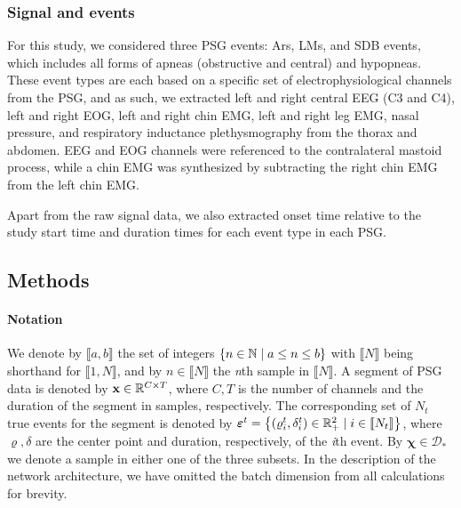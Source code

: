 \subsubsection{Signal and events}
For this study, we considered three \ac{PSG} events: \acp{Ar}, \acp{LM}, and \ac{SDB} events, which includes all forms of apneas (obstructive and central) and hypopneas.
These event types are each based on a specific set of electrophysiological channels from the \ac{PSG}, and as such, we extracted left and right central \ac{EEG} (C3 and C4), left and right \ac{EOG}, left and right chin \ac{EMG}, left and right leg \ac{EMG}, nasal pressure, and respiratory inductance plethysmography from the thorax and abdomen.
\Ac{EEG} and \ac{EOG} channels were referenced to the contralateral mastoid process, while a chin \ac{EMG} was synthesized by subtracting the right chin \ac{EMG} from the left chin \ac{EMG}.

Apart from the raw signal data, we also extracted onset time relative to the study start time and duration times for each event type in each \ac{PSG}.



\subsection{Methods}

\paragraph{Notation}
We denote by \(\llbracket a, b \rrbracket\) the set of integers \(\lbrace n \in \mathbb{N} \mid a \leq n \leq b\rbrace\) with \(\llbracket N \rrbracket\) being shorthand for \(\llbracket 1, N \rrbracket\), and by \(n \in \llbracket N \rrbracket \) the \textit{n}th sample in \(\llbracket N \rrbracket\).
A segment of PSG data is denoted by \(\mathbf{x} \in \mathbb{R}^{C \times T}\), where \(C, T\) is the number of channels and the duration of the segment in samples, respectively.
The corresponding set of \(N_t\) true events for the segment is denoted by \( \boldsymbol{\varepsilon}^{t} = \braces*{ \parentheses*{ \varrho^{t}_{i}, \delta^{t}_{i}} \in \R{2}_+ \mid i \in \bbrackets*{ N_{t} } } \), where \(\varrho, \delta\) are the center point and duration, respectively, of the \textit{i}th event.
By \(\mathbf{\chi} \in \mathcal{D}_\ast\) we denote a sample in either one of the three subsets.
In the description of the network architecture, we have omitted the batch dimension from all calculations for brevity.

